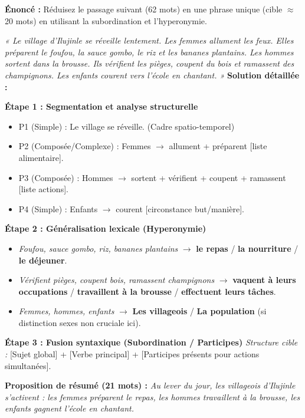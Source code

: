 \documentclass[11pt]{article}
\begin{document}
\begin{exoresolu}
    \textbf{Énoncé :} Réduisez le passage suivant (62 mots) en une phrase unique (cible $\approx$ 20 mots) en utilisant la subordination et l'hyperonymie.
    
    \textit{« Le village d'Ilujinle se réveille lentement. Les femmes allument les feux. Elles préparent le foufou, la sauce gombo, le riz et les bananes plantains. Les hommes sortent dans la brousse. Ils vérifient les pièges, coupent du bois et ramassent des champignons. Les enfants courent vers l'école en chantant. »}
    \tcblower
    \textbf{Solution détaillée :}
    
    \textbf{Étape 1 : Segmentation et analyse structurelle}
    \begin{itemize}
        \item P1 (Simple) : Le village se réveille. (Cadre spatio-temporel)
        \item P2 (Composée/Complexe) : Femmes $\rightarrow$ allument + préparent [liste alimentaire].
        \item P3 (Composée) : Hommes $\rightarrow$ sortent + vérifient + coupent + ramassent [liste actions].
        \item P4 (Simple) : Enfants $\rightarrow$ courent [circonstance but/manière].
    \end{itemize}
    
    \textbf{Étape 2 : Généralisation lexicale (Hyperonymie)}
    \begin{itemize}
        \item \textit{Foufou, sauce gombo, riz, bananes plantains} $\rightarrow$ \textbf{le repas} / \textbf{la nourriture} / \textbf{le déjeuner}.
        \item \textit{Vérifient pièges, coupent bois, ramassent champignons} $\rightarrow$ \textbf{vaquent à leurs occupations} / \textbf{travaillent à la brousse} / \textbf{effectuent leurs tâches}.
        \item \textit{Femmes, hommes, enfants} $\rightarrow$ \textbf{Les villageois} / \textbf{La population} (si distinction sexes non cruciale ici).
    \end{itemize}
    
    \textbf{Étape 3 : Fusion syntaxique (Subordination / Participes)}
    \textit{Structure cible :} [Sujet global] + [Verbe principal] + [Participes présents pour actions simultanées].
    
    \textbf{Proposition de résumé (21 mots) :}
    \emph{Au lever du jour, les villageois d'Ilujinle s'activent : les femmes préparent le repas, les hommes travaillent à la brousse, les enfants gagnent l'école en chantant.}
    

\end{exoresolu}
\end{document}

